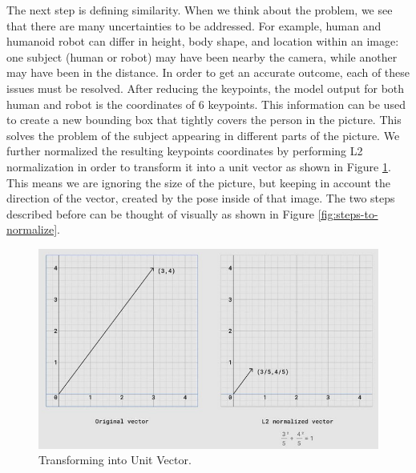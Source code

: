 

The next step is defining similarity. When we think about the problem, we see that there are many uncertainties to be addressed. For example, human and humanoid robot can differ in height, body shape, and location within an image: one subject (human or robot) may have been nearby the camera,
while another may have been in the distance. In order to get an accurate outcome, each of these issues must be resolved.
After reducing the keypoints, the model output for both human and robot is the coordinates of 6 keypoints. This information can be used to create a new bounding box that tightly covers the person in the picture. This solves the problem of the subject appearing in different parts of the picture.
We further normalized the resulting keypoints coordinates by performing L2 normalization in order to transform it into a unit vector as shown in Figure \ref{fig:transforming-into-unit-vector}. This means we are ignoring the size of the picture, but keeping in account the direction of the vector, created by the pose inside of that image.
The two steps described before can be thought of visually as shown in Figure \ref{fig:steps-to-normalize}.

\begin{figure}[ht]
  \centering
  \includegraphics[scale=0.9]{gambar/transform-to-unit-vector.png}
  \caption{Transforming into Unit Vector.}
  \label{fig:transforming-into-unit-vector}
\end{figure}

